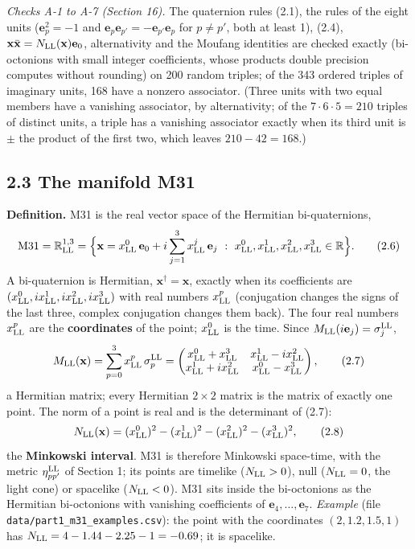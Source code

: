 \documentclass[
  10pt,
]{article}
\begin{document}
\emph{Checks A-1 to A-7 (Section 16).} The quaternion rules (2.1), the
rules of the eight units (\(\mathbf e_p^2=-1\) and
\(\mathbf e_p\mathbf e_{p'}=-\mathbf e_{p'}\mathbf e_p\) for
\(p\neq p'\), both at least 1), (2.4),
\(\mathbf x\bar{\mathbf x}=N_{\rm LL}(\mathbf x)\mathbf e_0\),
alternativity and the Moufang identities are checked exactly
(bi-octonions with small integer coefficients, whose products double
precision computes without rounding) on 200 random triples; of the 343
ordered triples of imaginary units, 168 have a nonzero associator.
(Three units with two equal members have a vanishing associator, by
alternativity; of the \(7\cdot6\cdot5=210\) triples of distinct units, a
triple has a vanishing associator exactly when its third unit is \(\pm\)
the product of the first two, which leaves \(210-42=168\).)

\hypertarget{the-manifold-m31}{%
\subsection{2.3 The manifold M31}\label{the-manifold-m31}}

\textbf{Definition.} M31 is the real vector space of the Hermitian
bi-quaternions,
\[\mathrm{M31}=\mathbb R^{1,3}_{\rm LL}=\Big\{\mathbf x=x^0_{\rm LL}\,\mathbf e_0+i\sum_{j=1}^3x^j_{\rm LL}\,\mathbf e_j\ :\ x^0_{\rm LL},x^1_{\rm LL},x^2_{\rm LL},x^3_{\rm LL}\in\mathbb R\Big\}.\tag{2.6}\]
A bi-quaternion is Hermitian, \(\mathbf x^\dagger=\mathbf x\), exactly
when its coefficients are
\((x^0_{\rm LL},ix^1_{\rm LL},ix^2_{\rm LL},ix^3_{\rm LL})\) with real
numbers \(x^p_{\rm LL}\) (conjugation changes the signs of the last
three, complex conjugation changes them back). The four real numbers
\(x^p_{\rm LL}\) are the \textbf{coordinates} of the point;
\(x^0_{\rm LL}\) is the time. Since
\(M_{\rm LL}(i\mathbf e_j)=\sigma^{\rm LL}_j\),
\[M_{\rm LL}(\mathbf x)=\sum_{p=0}^3x^p_{\rm LL}\,\sigma^{\rm LL}_p=\begin{pmatrix}x^0_{\rm LL}+x^3_{\rm LL}&x^1_{\rm LL}-ix^2_{\rm LL}\\x^1_{\rm LL}+ix^2_{\rm LL}&x^0_{\rm LL}-x^3_{\rm LL}\end{pmatrix},\tag{2.7}\]
a Hermitian matrix; every Hermitian \(2\times2\) matrix is the matrix of
exactly one point. The norm of a point is real and is the determinant of
(2.7):
\[N_{\rm LL}(\mathbf x)=(x^0_{\rm LL})^2-(x^1_{\rm LL})^2-(x^2_{\rm LL})^2-(x^3_{\rm LL})^2,\tag{2.8}\]
the \textbf{Minkowski interval}. M31 is therefore Minkowski space-time,
with the metric \(\eta^{\rm LL}_{pp'}\) of Section 1; its points are
timelike (\(N_{\rm LL}>0\)), null (\(N_{\rm LL}=0\), the light cone) or
spacelike (\(N_{\rm LL}<0\)). M31 sits inside the bi-octonions as the
Hermitian bi-octonions with vanishing coefficients of
\(\mathbf e_4,\dots,\mathbf e_7\). \emph{Example} (file
\texttt{data/part1\_m31\_examples.csv}): the point with the coordinates
\((2,1.2,1.5,1)\) has \(N_{\rm LL}=4-1.44-2.25-1=-0.69\); it is
spacelike.
\end{document}
